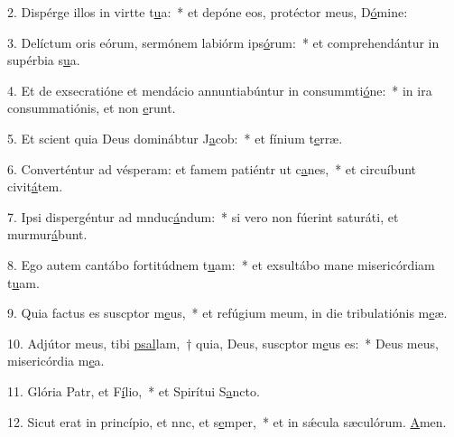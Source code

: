 2. Dispérge illos in virtte t\uline{u}a:~* et depóne eos, protéctor meus, D\uline{ó}mine:\par 
3. Delíctum oris eórum, sermónem labiórm ips\uline{ó}rum:~* et comprehendántur in supérbia s\uline{u}a.\par 
4. Et de exsecratióne et mendácio annuntiabúntur in consummti\uline{ó}ne:~* in ira consummatiónis, et non \uline{e}runt.\par 
5. Et scient quia Deus dominábtur J\uline{a}cob:~* et fínium t\uline{e}rræ.\par 
6. Converténtur ad vésperam: et famem patiéntr ut c\uline{a}nes,~* et circuíbunt civit\uline{á}tem.\par 
7. Ipsi dispergéntur ad mnduc\uline{á}ndum:~* si vero non fúerint saturáti, et murmur\uline{á}bunt.\par 
8. Ego autem cantábo fortitúdnem t\uline{u}am:~* et exsultábo mane misericórdiam t\uline{u}am.\par 
9. Quia factus es suscptor m\uline{e}us,~* et refúgium meum, in die tribulatiónis m\uline{e}æ.\par 
10. Adjútor meus, tibi \uline{psal}lam,~† quia, Deus, suscptor m\uline{e}us es:~* Deus meus, misericórdia m\uline{e}a.\par 
11. Glória Patr, et F\uline{í}lio,~* et Spirítui S\uline{a}ncto.\par 
12. Sicut erat in princípio, et nnc, et s\uline{e}mper,~* et in sǽcula sæculórum. \uline{A}men.\par 
